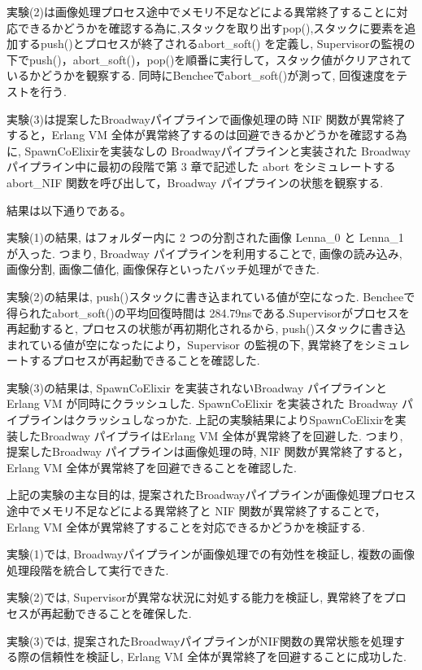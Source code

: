\documentclass[a4paper]{jreport}	%
\begin{document}
実験(2)は画像処理プロセス途中でメモリ不足などによる異常終了することに対応できるかどうかを確認する為に,スタックを取り出すpop(),スタックに要素を追加するpush()とプロセスが終了されるabort\_soft() を定義し, Supervisorの監視の下でpush()，abort\_soft()，pop()を順番に実行して，スタック値がクリアされているかどうかを観察する. 同時にBencheeでabort\_soft()が測って, 回復速度をテストを行う.

実験(3)は提案したBroadwayパイプラインで画像処理の時 NIF 関数が異常終了すると，Erlang VM 全体が異常終了するのは回避できるかどうかを確認する為に, SpawnCoElixirを実装なしの Broadwayパイプラインと実装された Broadway パイプライン中に最初の段階で第 3 章で記述した abort をシミュレートするabort\_NIF 関数を呼び出して，Broadway パイプラインの状態を観察する.

結果は以下通りである。

実験(1)の結果, はフォルダー内に 2 つの分割された画像 Lenna\_0 と Lenna\_1 が入った. つまり, Broadway パイプラインを利用することで, 画像の読み込み, 画像分割, 画像二値化, 画像保存といったバッチ処理ができた.

実験(2)の結果は, push()スタックに書き込まれている値が空になった. Bencheeで得られたabort\_soft()の平均回復時間は 284.79nsである.Supervisorがプロセスを再起動すると, プロセスの状態が再初期化されるから, push()スタックに書き込まれている値が空になったにより，Supervisor の監視の下, 異常終了をシミュレートするプロセスが再起動できることを確認した.

実験(3)の結果は, SpawnCoElixir を実装されないBroadway パイプラインとErlang VM が同時にクラッシュした. SpawnCoElixir を実装された Broadway パイプラインはクラッシュしなっかた. 上記の実験結果によりSpawnCoElixirを実装したBroadway パイプライはErlang VM 全体が異常終了を回避した. つまり, 提案したBroadway パイプラインは画像処理の時, NIF 関数が異常終了すると，Erlang VM 全体が異常終了を回避できることを確認した.

上記の実験の主な目的は, 提案されたBroadwayパイプラインが画像処理プロセス途中でメモリ不足などによる異常終了と NIF 関数が異常終了することで，Erlang VM 全体が異常終了することを対応できるかどうかを検証する.

実験(1)では, Broadwayパイプラインが画像処理での有効性を検証し, 複数の画像処理段階を統合して実行できた.

実験(2)では, Supervisorが異常な状況に対処する能力を検証し, 異常終了をプロセスが再起動できることを確保した.

実験(3)では, 提案されたBroadwayパイプラインがNIF関数の異常状態を処理する際の信頼性を検証し, Erlang VM 全体が異常終了を回避することに成功した.
\end{document}
